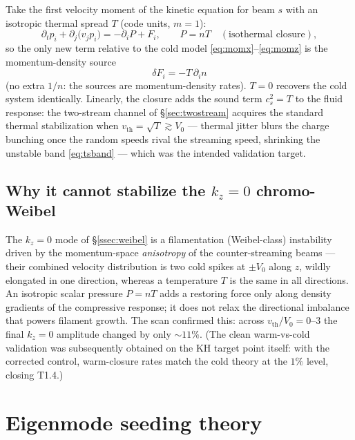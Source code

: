 \documentclass[11pt,a4paper]{article}
\numberwithin{equation}{section}
\theoremstyle{remark}
\newcommand{\Vo}{V_0}
\newcommand{\kz}{k_z}
\begin{document}
Take the first velocity moment of the kinetic equation for beam $s$ with
an isotropic thermal spread $T$ (code units, $m=1$):
\begin{equation}
\partial_t p_i+\partial_j\bigl(v_jp_i\bigr)
=-\partial_i P+F_i,
\qquad P=nT\quad(\text{isothermal closure}),
\end{equation}
so the only new term relative to the cold model
\eqref{eq:momx}--\eqref{eq:momz} is the momentum-density source
\begin{equation}
\boxed{\;\delta F_i=-T\,\partial_i n\;}
\end{equation}
(no extra $1/n$: the sources are momentum-density rates). $T=0$ recovers
the cold system identically. Linearly, the closure adds the sound term
$c_s^2=T$ to the fluid response: the two-stream channel of
\S\ref{sec:twostream} acquires the standard thermal stabilization when
$v_{\mathrm{th}}=\sqrt T\gtrsim\Vo$ --- thermal jitter blurs the charge
bunching once the random speeds rival the streaming speed, shrinking
the unstable band \eqref{eq:tsband} --- which was the intended
validation target.

\subsection{Why it cannot stabilize the $\kz=0$ chromo-Weibel}

The $\kz=0$ mode of \S\ref{ssec:weibel} is a filamentation
(Weibel-class) instability driven by the momentum-space
\emph{anisotropy} of the counter-streaming beams --- their combined
velocity distribution is two cold spikes at $\pm\Vo$ along $z$, wildly
elongated in one direction, whereas a temperature $T$ is the same in
all directions. An isotropic scalar
pressure $P=nT$ adds a restoring force only along density gradients of
the compressive response; it does not relax the directional imbalance
that powers filament growth. The scan confirmed this: across
$v_{\mathrm{th}}/\Vo=0$--$3$ the final $\kz=0$ amplitude changed by only
${\sim}11\%$. (The clean warm-vs-cold validation was subsequently obtained
on the KH target point itself: with the corrected control, warm-closure
rates match the cold theory at the $1\%$ level, closing T1.4.)

\section{Eigenmode seeding theory}
\label{sec:seeding}
\end{document}
